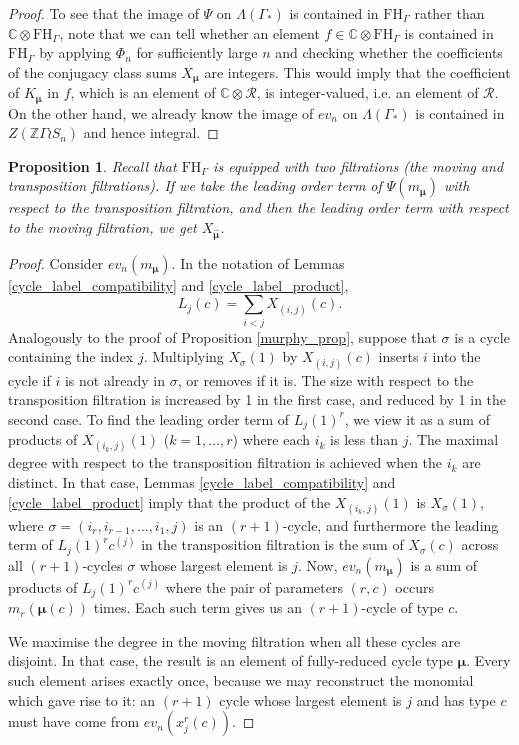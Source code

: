 \documentclass[10pt]{article}
\newtheorem{proposition}[theorem]{Proposition}
\theoremstyle{definition}
\newcommand{\bs}{\boldsymbol}
\newcommand{\LambdaG}{\Lambda(\Gamma_*)}
\newcommand{\FHG}{\mathrm{FH}_{\Gamma}}
\begin{document}
\begin{proof}
To see that the image of $\Psi$ on $\LambdaG$ is contained in $\FHG$ rather than $\mathbb{C}\otimes \FHG$, note that we can tell whether an element $f \in \mathbb{C} \otimes \FHG$ is contained in $\FHG$ by applying $\Phi_n$ for sufficiently large $n$ and checking whether the coefficients of the conjugacy class sums $X_{\bs\mu}$ are integers. This would imply that the coefficient of $K_{\bs\mu}$ in $f$, which is an element of $\mathbb{C} \otimes \mathcal{R}$, is integer-valued, i.e. an element of $\mathcal{R}$. On the other hand, we already know the image of $ev_n$ on $\LambdaG$ is contained in $Z(\mathbb{Z}\Gamma \wr S_n)$ and hence integral.

\end{proof}


\begin{proposition}
Recall that $\FHG$ is equipped with two filtrations \textup{(}the moving and transposition filtrations\textup{)}. If we take the leading order term of $\Psi(m_{\bs\mu})$ with respect to the transposition filtration, and then the leading order term with respect to the  moving filtration, we get $X_{\bm\hat{\bs\mu}}$.
\end{proposition}

\begin{proof}
Consider $ev_n(m_{\bs\mu})$. In the notation of Lemmas \ref{cycle_label_compatibility} and \ref{cycle_label_product},
\[
L_j(c) = \sum_{i<j} X_{(i,j)}(c).
\]
Analogously to the proof of Proposition \ref{murphy_prop}, suppose that $\sigma$ is a cycle containing the index $j$. Multiplying $X_{\sigma}(1)$ by $X_{(i,j)}(c)$ inserts $i$ into the cycle if $i$ is not already in $\sigma$, or removes if it is. The size with respect to the transposition filtration is increased by 1 in the first case, and reduced by 1 in the second case. To find the leading order term of $L_j(1)^r$, we view it as a sum of products of $X_{(i_k,j)}(1)$ ($k=1,\ldots,r$) where each $i_k$ is less than $j$. The maximal degree with respect to the transposition filtration is achieved when the $i_k$ are distinct. In that case, Lemmas \ref{cycle_label_compatibility} and \ref{cycle_label_product} imply that the product of the $X_{(i_k,j)}(1)$ is $X_{\sigma}(1)$, where $\sigma = (i_r, i_{r-1}, \ldots, i_1, j)$ is an $(r+1)$-cycle, and furthermore the leading term of $L_j(1)^r c^{(j)}$ in the transposition filtration is the sum of $X_{\sigma}(c)$ across all $(r+1)$-cycles $\sigma$ whose largest element is $j$. Now, $ev_n(m_{\bs\mu})$ is a sum of products of $L_j(1)^r c^{(j)}$ where the pair of parameters $(r, c)$ occurs $m_r(\bs\mu(c))$ times. Each such term gives us an $(r+1)$-cycle of type $c$.

We maximise the degree in the moving filtration when all these cycles are disjoint. In that case, the result is an element of fully-reduced cycle type $\bs\mu$. Every such element arises exactly once, because we may reconstruct the monomial which gave rise to it: an $(r+1)$ cycle whose largest element is $j$ and has type $c$ must have come from $ev_n(x_j^r(c))$.
\end{proof}
\end{document}
